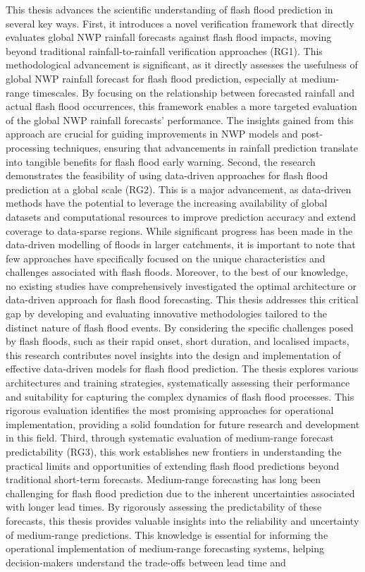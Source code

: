 This  thesis advances the scientific understanding of flash flood prediction in several key ways. First, it introduces a novel verification framework that directly evaluates global NWP rainfall forecasts against flash flood impacts, moving beyond traditional rainfall-to-rainfall verification approaches (RG1). This methodological advancement is significant, as it directly assesses the usefulness of global NWP rainfall forecast for flash flood prediction, especially at medium-range timescales. By focusing on the relationship between forecasted rainfall and actual flash flood occurrences, this framework enables a more targeted evaluation of the global NWP rainfall forecasts' performance. The insights gained from this approach are crucial for guiding improvements in NWP models and post-processing techniques, ensuring that advancements in rainfall prediction translate into tangible benefits for flash flood early warning. Second, the research demonstrates the feasibility of using data-driven approaches for flash flood prediction at a global scale (RG2). This is a major advancement, as data-driven methods have the potential to leverage the increasing availability of global datasets and computational resources to improve prediction accuracy and extend coverage to data-sparse regions. While significant progress has been made in the data-driven modelling of floods in larger catchments, it is important to note that few approaches have specifically focused on the unique characteristics and challenges associated with flash floods. Moreover, to the best of our knowledge, no existing studies have comprehensively investigated the optimal architecture or data-driven approach for flash flood forecasting. This thesis addresses this critical gap by developing and evaluating innovative methodologies tailored to the distinct nature of flash flood events. By considering the specific challenges posed by flash floods, such as their rapid onset, short duration, and localised impacts, this research contributes novel insights into the design and implementation of effective data-driven models for flash flood prediction. The thesis explores various architectures and training strategies, systematically assessing their performance and suitability for capturing the complex dynamics of flash flood processes. This rigorous evaluation identifies the most promising approaches for operational implementation, providing a solid foundation for future research and development in this field. Third, through systematic evaluation of medium-range forecast predictability (RG3), this work establishes new frontiers in understanding the practical limits and opportunities of extending flash flood predictions beyond traditional short-term forecasts. Medium-range forecasting has long been challenging for flash flood prediction due to the inherent uncertainties associated with longer lead times. By rigorously assessing the predictability of these forecasts, this thesis provides valuable insights into the reliability and uncertainty of medium-range predictions. This knowledge is essential for informing the operational implementation of medium-range forecasting systems, helping decision-makers understand the trade-offs between lead time and 